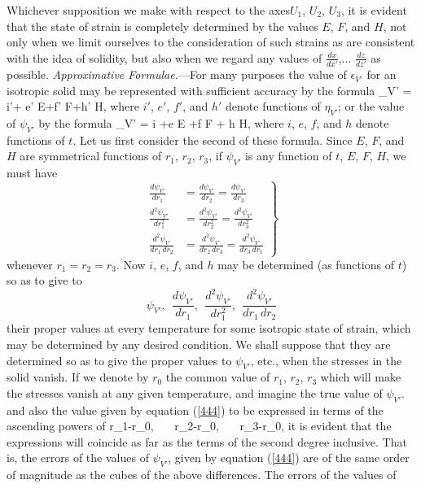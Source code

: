 \documentclass[12pt]{article}
\begin{document}
{Whichever supposition we make with respect to the axes$U_1$, $U_2$, $U_3$, it is evident that the state of strain is completely determined by the values $E$, $F$, and $H$, not only when we limit ourselves to the consideration of such strains as are consistent with the idea of solidity, but also when we regard any values of $\frac{dx}{dx'}$,... $\frac{dz}{dz'}$ as possible.
\textit{Approximative Formulae.}---For many purposes the value of $\epsilon_{V'}$ for an isotropic solid may be represented with sufficient accuracy by the formula
\eqs \epsilon_{V'} = i'+ e' E+f' F+h' H,   \label{443}\eqe
where $i'$, $e'$, $f'$, and $h'$ denote functions of $\eta_{V'}$; or the value of $\psi_{V'}$ by the formula
\eqs \psi_{V'} = i +e E +f F + h H,       \label{444}\eqe
where $i$, $e$, $f$, and $h$ denote functions of $t$. Let us first consider the second of these formula. Since $E$, $F$, and $H$ are symmetrical functions of $r_1$, $r_2$, $r_3$, if $\psi_{V'}$ is any function of $t$, $E$, $F$, $H$, we must have
\begin{equation} \left. \begin{aligned}
\frac{d\psi_{V'}}{dr_1}&=\frac{d\psi_{V'}}{dr_2}=\frac{d\psi_{V'}}{dr_3} \\
\frac{d^2\psi_{V'}}{dr_1^2}&=\frac{d^2\psi_{V'}}{dr_2^2}=\frac{d^2\psi_{V'}}{dr_3^2} \\
\frac{d^2\psi_{V'}}{dr_1 \, dr_2}&=\frac{d^2\psi_{V'}}{dr_2\, dr_3}=\frac{d^2\psi_{V'}}{dr_3\,dr_1} \end{aligned}\right\}\label{445}\end{equation}
whenever $r_1=r_2=r_3$.   Now $i$, $e$, $f$, and $h$ may be determined (as functions of $t$) so as to give to
$$\psi_{V'},\ \ \frac{d\psi_{V'}}{dr_1}, \ \ \frac{d^2\psi_{V'}}{dr_1^2}, \ \ \frac{d^2\psi_{V'}}{dr_1 \, dr_2}$$
their proper values at every temperature for some isotropic state of strain, which may be determined by any desired condition. We shall suppose that they are determined so as to give the proper values to $\psi_{V'}$, etc., when the stresses in the solid vanish.  If we denote by $r_0$ the common value of $r_1$, $r_2$, $r_3$ which will make the stresses vanish at any given temperature, and imagine the true value of $\psi_{V'}$. and also the value given by equation (\ref{444}) to be expressed in terms of the ascending powers of
\eqs r_1-r_0, \ \ \   r_2-r_0, \ \ \ r_3-r_0,   \label{446}\eqe
it is evident that the expressions will coincide as far as the terms of the second degree inclusive. That is, the errors of the values of $\psi_{V'}$, given by equation (\ref{444}) are of the same order of magnitude as the cubes of the above differences. The errors of the values of
}
\end{document}
